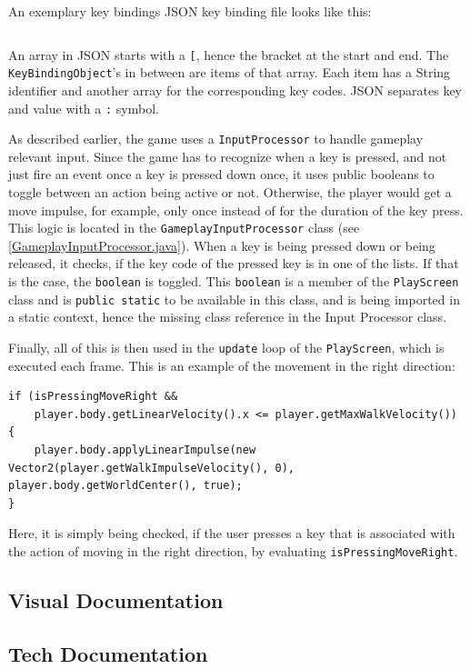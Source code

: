 \documentclass[12p]{article}
\begin{document}
An exemplary key bindings JSON key binding file looks like this:
\inputminted[linenos,breaklines]{json}{code/json/keybindings.json}

An array in JSON starts with a \texttt{[}, hence the bracket at the start and end. The \texttt{KeyBindingObject}'s in between are items of that array. Each item has a String identifier and another array for the corresponding key codes. JSON separates key and value with a \texttt{:} symbol.

As described earlier, the game uses a \texttt{InputProcessor} to handle gameplay relevant input. Since the game has to recognize when a key is pressed, and not just fire an event once a key is pressed down once, it uses public booleans to toggle between an action being active or not. Otherwise, the player would get a move impulse, for example, only once instead of for the duration of the key press. This logic is located in the \texttt{GameplayInputProcessor} class (see \ref{GameplayInputProcessor.java}). When a key is being pressed down or being released, it checks, if the key code of the pressed key is in one of the lists. If that is the case, the \texttt{boolean} is toggled. This \texttt{boolean} is a member of the \texttt{PlayScreen} class and is \texttt{public static} to be available in this class, and is being imported in a static context, hence the missing class reference in the Input Processor class.

Finally, all of this is then used in the \texttt{update} loop of the \texttt{PlayScreen}, which is executed each frame. This is an example of the movement in the right direction:

\begin{verbatim}
if (isPressingMoveRight &&
    player.body.getLinearVelocity().x <= player.getMaxWalkVelocity()) 
{
    player.body.applyLinearImpulse(new Vector2(player.getWalkImpulseVelocity(), 0), player.body.getWorldCenter(), true);
}
\end{verbatim}

Here, it is simply being checked, if the user presses a key that is associated with the action of moving in the right direction, by evaluating \texttt{isPressingMoveRight}.

\subsection{Visual Documentation}

\subsection{Tech Documentation}
\end{document}

